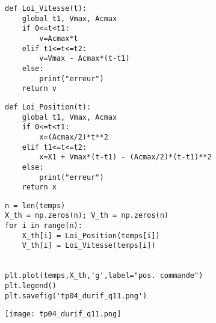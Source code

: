 

\begin{minipage}{0.5\textwidth}
\begin{lstlisting}
def Loi_Vitesse(t):
    global t1, Vmax, Acmax
    if 0<=t<t1:
        v=Acmax*t
    elif t1<=t<=t2:
        v=Vmax - Acmax*(t-t1)
    else:
        print("erreur")
    return v
\end{lstlisting}

\end{minipage}
\begin{minipage}{0.5\textwidth}
\begin{lstlisting}
def Loi_Position(t):
    global t1, Vmax, Acmax
    if 0<=t<t1:
        x=(Acmax/2)*t**2
    elif t1<=t<=t2:
        x=X1 + Vmax*(t-t1) - (Acmax/2)*(t-t1)**2
    else:
        print("erreur")
    return x
\end{lstlisting}

\end{minipage}




\begin{minipage}{0.5\textwidth}
\begin{lstlisting}
n = len(temps)
X_th = np.zeros(n); V_th = np.zeros(n)
for i in range(n):
    X_th[i] = Loi_Position(temps[i])
    V_th[i] = Loi_Vitesse(temps[i])
    
    
plt.plot(temps,X_th,'g',label="pos. commande")
plt.legend()
plt.savefig('tp04_durif_q11.png')

\end{lstlisting}

\end{minipage}
\begin{minipage}{0.5\textwidth}
\begin{center}
\texttt{[image: tp04\_durif\_q11.png]}
\end{center}
\end{minipage}


